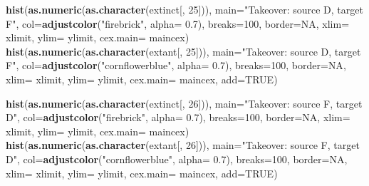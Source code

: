 \documentclass[]{book}
\newenvironment{Shaded}{\begin{snugshade}}{\end{snugshade}}
\newcommand{\KeywordTok}[1]{\textcolor[rgb]{0.13,0.29,0.53}{\textbf{{#1}}}}
\newcommand{\DataTypeTok}[1]{\textcolor[rgb]{0.13,0.29,0.53}{{#1}}}
\newcommand{\DecValTok}[1]{\textcolor[rgb]{0.00,0.00,0.81}{{#1}}}
\newcommand{\FloatTok}[1]{\textcolor[rgb]{0.00,0.00,0.81}{{#1}}}
\newcommand{\StringTok}[1]{\textcolor[rgb]{0.31,0.60,0.02}{{#1}}}
\newcommand{\OtherTok}[1]{\textcolor[rgb]{0.56,0.35,0.01}{{#1}}}
\newcommand{\NormalTok}[1]{{#1}}
\theoremstyle{definition}
\theoremstyle{definition}
\theoremstyle{remark}
\begin{document}
\begin{Shaded}
\begin{Highlighting}[]
\KeywordTok{hist}\NormalTok{(}\KeywordTok{as.numeric}\NormalTok{(}\KeywordTok{as.character}\NormalTok{(extinct[, }\DecValTok{25}\NormalTok{])), }\DataTypeTok{main=}\StringTok{"Takeover: source D, target F"}\NormalTok{, }\DataTypeTok{col=}\KeywordTok{adjustcolor}\NormalTok{(}\StringTok{"firebrick"}\NormalTok{, }\DataTypeTok{alpha=} \FloatTok{0.7}\NormalTok{), }\DataTypeTok{breaks=}\DecValTok{100}\NormalTok{, }\DataTypeTok{border=}\OtherTok{NA}\NormalTok{, }\DataTypeTok{xlim=}\NormalTok{ xlimit, }\DataTypeTok{ylim=}\NormalTok{ ylimit, }\DataTypeTok{cex.main=}\NormalTok{ maincex)}
\KeywordTok{hist}\NormalTok{(}\KeywordTok{as.numeric}\NormalTok{(}\KeywordTok{as.character}\NormalTok{(extant[, }\DecValTok{25}\NormalTok{])), }\DataTypeTok{main=}\StringTok{"Takeover: source D, target F"}\NormalTok{, }\DataTypeTok{col=}\KeywordTok{adjustcolor}\NormalTok{(}\StringTok{"cornflowerblue"}\NormalTok{, }\DataTypeTok{alpha=} \FloatTok{0.7}\NormalTok{), }\DataTypeTok{breaks=}\DecValTok{100}\NormalTok{, }\DataTypeTok{border=}\OtherTok{NA}\NormalTok{, }\DataTypeTok{xlim=}\NormalTok{ xlimit, }\DataTypeTok{ylim=}\NormalTok{ ylimit, }\DataTypeTok{cex.main=}\NormalTok{ maincex, }\DataTypeTok{add=}\OtherTok{TRUE}\NormalTok{)}

\KeywordTok{hist}\NormalTok{(}\KeywordTok{as.numeric}\NormalTok{(}\KeywordTok{as.character}\NormalTok{(extinct[, }\DecValTok{26}\NormalTok{])), }\DataTypeTok{main=}\StringTok{"Takeover: source F, target D"}\NormalTok{, }\DataTypeTok{col=}\KeywordTok{adjustcolor}\NormalTok{(}\StringTok{"firebrick"}\NormalTok{, }\DataTypeTok{alpha=} \FloatTok{0.7}\NormalTok{), }\DataTypeTok{breaks=}\DecValTok{100}\NormalTok{, }\DataTypeTok{border=}\OtherTok{NA}\NormalTok{, }\DataTypeTok{xlim=}\NormalTok{ xlimit, }\DataTypeTok{ylim=}\NormalTok{ ylimit, }\DataTypeTok{cex.main=}\NormalTok{ maincex)}
\KeywordTok{hist}\NormalTok{(}\KeywordTok{as.numeric}\NormalTok{(}\KeywordTok{as.character}\NormalTok{(extant[, }\DecValTok{26}\NormalTok{])), }\DataTypeTok{main=}\StringTok{"Takeover: source F, target D"}\NormalTok{, }\DataTypeTok{col=}\KeywordTok{adjustcolor}\NormalTok{(}\StringTok{"cornflowerblue"}\NormalTok{, }\DataTypeTok{alpha=} \FloatTok{0.7}\NormalTok{), }\DataTypeTok{breaks=}\DecValTok{100}\NormalTok{, }\DataTypeTok{border=}\OtherTok{NA}\NormalTok{, }\DataTypeTok{xlim=}\NormalTok{ xlimit, }\DataTypeTok{ylim=}\NormalTok{ ylimit, }\DataTypeTok{cex.main=}\NormalTok{ maincex, }\DataTypeTok{add=}\OtherTok{TRUE}\NormalTok{)}


\end{Highlighting}
\end{Shaded}
\end{document}
